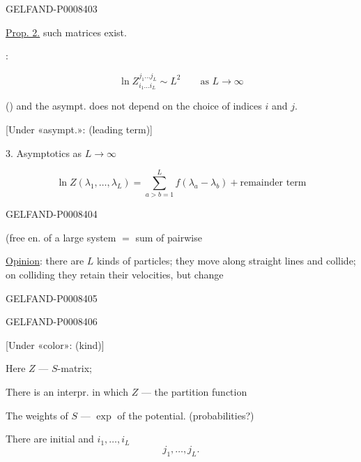 \begin{GelfandAdjacentEvidence}{GELFAND-P000840}{3}


\uline{Prop. 2.} such matrices exist.

:

\begin{equation*}
\ln Z^{j_1\ldots j_L}_{i_1\ldots i_L}\sim L^2
\qquad\text{as }L\to\infty\tag{4}
\end{equation*}

() and the asympt. does not depend on the choice of indices \(i\) and \(j\).

[Under «asympt.»: (leading term)]

 3. Asymptotics as \(L\to\infty\)

\begin{equation*}
\ln Z(\lambda_1,\ldots,\lambda_L)
=\sum_{a>b=1}^{L}f(\lambda_a-\lambda_b)+\text{remainder term}\tag{5}
\end{equation*}
\end{GelfandAdjacentEvidence}
\begin{GelfandAdjacentEvidence}{GELFAND-P000840}{4}


(free en. of a large system \(=\) sum of pairwise

\uline{Opinion}: there are \(L\) kinds of particles; they move along straight lines and collide; on colliding they retain their velocities, but change 
\end{GelfandAdjacentEvidence}
\begin{GelfandAdjacentEvidence}{GELFAND-P000840}{5}

\end{GelfandAdjacentEvidence}
\begin{GelfandAdjacentEvidence}{GELFAND-P000840}{6}


[Under «color»: (kind)]

Here \(Z\) — \(S\)-matrix;

There is an interpr. in which \(Z\) — the partition function

The weights of \(S\) — \(\exp\) of the potential. (probabilities?)

There are initial and  \(i_1,\ldots,i_L\)
\[
j_1,\ldots,j_L.
\]

\end{GelfandAdjacentEvidence}
